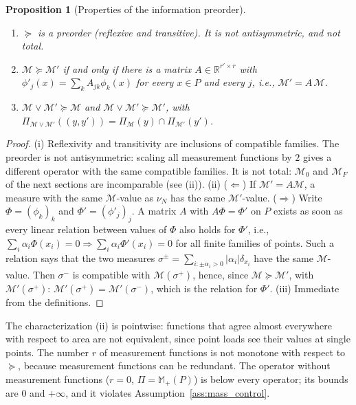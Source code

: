 \documentclass[11pt,a4paper]{article}
\theoremstyle{plain}
\newtheorem{proposition}[theorem]{Proposition}
\newcommand{\R}{\mathbb{R}}
\begin{document}
\begin{proposition}[Properties of the information preorder]
\label{prop:preorder}
    \begin{enumerate}[label=(\roman*)]
        \item $\succeq$ is a preorder (reflexive and transitive). It is not antisymmetric, and not total.
        \item $\mathcal M\succeq\mathcal M'$ if and only if there is a matrix $A\in\R^{r'\times r}$ with $\phi'_j(x)=\sum_kA_{jk}\phi_k(x)$ for every $x\in P$ and every $j$, i.e.,
        $\mathcal M'=A\,\mathcal M$.
        \item $\mathcal M\vee\mathcal M'\succeq\mathcal M$ and $\mathcal M\vee\mathcal M'\succeq\mathcal M'$, with $\Pi_{\mathcal M\vee\mathcal M'}((y,y'))=\Pi_{\mathcal M}(y)\cap\Pi_{\mathcal M'}(y')$.
    \end{enumerate}
\end{proposition}
\begin{proof}
    (i) Reflexivity and transitivity are inclusions of compatible families. The preorder is not antisymmetric: scaling all measurement functions by $2$ gives a different operator with the same
    compatible families. It is not total: $\mathcal M_0$ and $\mathcal M_F$ of the next sections are incomparable (see (ii)).
    (ii) ($\Leftarrow$) If $\mathcal M'=A\mathcal M$, a measure with the same $\mathcal M$-value as $\nu_N$ has the same $\mathcal M'$-value.
    ($\Rightarrow$) Write $\Phi=(\phi_k)_k$ and $\Phi'=(\phi'_j)_j$. A matrix $A$ with $A\Phi=\Phi'$ on $P$ exists as soon as every linear relation between values of $\Phi$ also holds for $\Phi'$, i.e.,
    $\sum_i\alpha_i\Phi(x_i)=0\Rightarrow\sum_i\alpha_i\Phi'(x_i)=0$ for all finite families of points. Such a relation says that the two measures
    $\sigma^\pm=\sum_{i:\pm\alpha_i>0}|\alpha_i|\delta_{x_i}$ have the same $\mathcal M$-value. Then $\sigma^-$ is compatible with $\mathcal M(\sigma^+)$, hence, since $\mathcal M\succeq\mathcal M'$,
    with $\mathcal M'(\sigma^+)$: $\mathcal M'(\sigma^+)=\mathcal M'(\sigma^-)$, which is the relation for $\Phi'$.
    (iii) Immediate from the definitions.
\end{proof}
The characterization (ii) is pointwise: functions that agree almost everywhere with respect to area are not equivalent, since point loads see their values at single points.
The number $r$ of measurement functions is not monotone with respect to $\succeq$, because measurement functions can be redundant. The operator
without measurement functions ($r=0$, $\Pi=\mathbb M_+(P)$) is below every operator; its bounds are $0$ and $+\infty$, and it violates
Assumption~\ref{ass:mass_control}.
\end{document}
